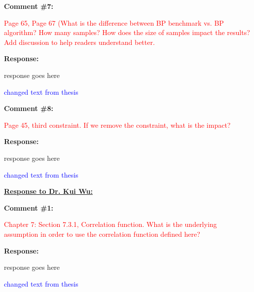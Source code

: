 \documentclass[journal]{IEEEtran}
\begin{document}
\vspace{30pt}
\textbf{Comment \#7:}
\begin{adjustwidth}{2.5em}{0pt}
\singlespacing \vspace{-10pt}
\textcolor{red}{Page 65, Page 67 (What is the difference between BP benchmark vs. BP algorithm? How many samples? How does the size of samples impact the results? Add discussion to help readers understand better.}
\end{adjustwidth}

\vspace{10pt}
\textbf{Response:}
\begin{adjustwidth}{2.5em}{0pt}
response goes here

\vspace{10pt}
\noindent\textcolor{blue}{changed text from thesis}
\end{adjustwidth}


\vspace{30pt}
\textbf{Comment \#8:}
\begin{adjustwidth}{2.5em}{0pt}
\singlespacing \vspace{-10pt}
\textcolor{red}{Page 45, third constraint. If we remove the constraint, what is the impact?}
\end{adjustwidth}

\vspace{10pt}
\textbf{Response:}
\begin{adjustwidth}{2.5em}{0pt}
response goes here

\vspace{10pt}
\noindent\textcolor{blue}{changed text from thesis}
\end{adjustwidth} 
 
 
 
 
 
\vspace{50pt}
  \Large
\noindent \textbf{\underline{Response to Dr. Kui Wu:}}
 \large

\vspace{10pt}
\textbf{Comment \#1:}
\begin{adjustwidth}{2.5em}{0pt}
\singlespacing \vspace{-10pt}
\textcolor{red}{Chapter 7: Section 7.3.1, Correlation function. What is the underlying assumption in order to use the correlation function defined here?}
\end{adjustwidth}

\vspace{10pt}
\textbf{Response:}
\begin{adjustwidth}{2.5em}{0pt}
response goes here

\vspace{10pt}
\noindent\textcolor{blue}{changed text from thesis}
\end{adjustwidth}
\end{document}
